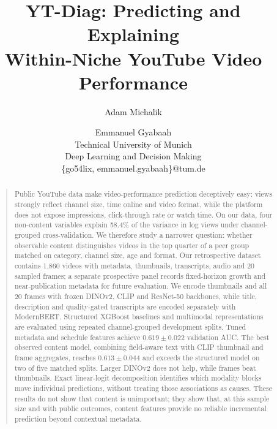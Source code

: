 \documentclass[letterpaper]{article}
\begin{document}
\title{YT-Diag: Predicting and Explaining\\Within-Niche YouTube Video Performance}
\author{Adam Michalik \and Emmanuel Gyabaah\\
Technical University of Munich\\
Deep Learning and Decision Making\\
\{go54lix, emmanuel.gyabaah\}@tum.de}
\maketitle

\begin{abstract}
\begin{quote}
Public YouTube data make video-performance prediction deceptively easy: views
strongly reflect channel size, time online and video format, while the platform
does not expose impressions, click-through rate or watch time. On our data, four
non-content variables explain 58.4\% of the variance in log views under
channel-grouped cross-validation. We therefore study a narrower question:
whether observable content distinguishes videos in the top quarter of a peer
group matched on category, channel size, age and format. Our retrospective
dataset contains 1,860 videos with metadata, thumbnails, transcripts, audio and
20 sampled frames; a separate prospective panel records fixed-horizon growth
and near-publication metadata for future evaluation. We encode thumbnails and
all 20 frames with frozen DINOv2, CLIP and ResNet-50 backbones, while title,
description and quality-gated transcripts are encoded separately with
ModernBERT. Structured XGBoost baselines and multimodal representations are
evaluated using repeated channel-grouped development splits. Tuned metadata and schedule
features achieve $0.619\pm0.022$ validation AUC. The best observed content model,
combining field-aware text with CLIP thumbnail and frame aggregates, reaches
$0.613\pm0.044$ and exceeds the structured model on two of five matched
splits. Larger DINOv2 does not help, while frames beat thumbnails. Exact linear-logit
decomposition identifies which modality blocks move individual predictions,
without treating those associations as causes. These results do not
show that content is unimportant; they show that, at this sample size and with
public outcomes, content features provide no reliable incremental prediction
beyond contextual metadata.
\end{quote}
\end{abstract}

\end{document}
